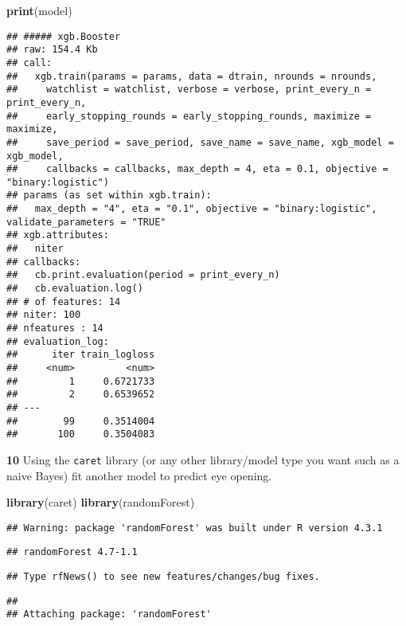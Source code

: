 \documentclass[
]{article}
\newenvironment{Shaded}{\begin{snugshade}}{\end{snugshade}}
\newcommand{\FunctionTok}[1]{\textcolor[rgb]{0.13,0.29,0.53}{\textbf{#1}}}
\newcommand{\NormalTok}[1]{#1}
\begin{document}
\begin{Shaded}
\begin{Highlighting}[]
\FunctionTok{print}\NormalTok{(model)}
\end{Highlighting}
\end{Shaded}

\begin{verbatim}
## ##### xgb.Booster
## raw: 154.4 Kb 
## call:
##   xgb.train(params = params, data = dtrain, nrounds = nrounds, 
##     watchlist = watchlist, verbose = verbose, print_every_n = print_every_n, 
##     early_stopping_rounds = early_stopping_rounds, maximize = maximize, 
##     save_period = save_period, save_name = save_name, xgb_model = xgb_model, 
##     callbacks = callbacks, max_depth = 4, eta = 0.1, objective = "binary:logistic")
## params (as set within xgb.train):
##   max_depth = "4", eta = "0.1", objective = "binary:logistic", validate_parameters = "TRUE"
## xgb.attributes:
##   niter
## callbacks:
##   cb.print.evaluation(period = print_every_n)
##   cb.evaluation.log()
## # of features: 14 
## niter: 100
## nfeatures : 14 
## evaluation_log:
##      iter train_logloss
##     <num>         <num>
##         1     0.6721733
##         2     0.6539652
## ---                    
##        99     0.3514004
##       100     0.3504083
\end{verbatim}

\textbf{10} Using the \texttt{caret} library (or any other library/model
type you want such as a naive Bayes) fit another model to predict eye
opening.

\begin{Shaded}
\begin{Highlighting}[]
\FunctionTok{library}\NormalTok{(caret)}
\FunctionTok{library}\NormalTok{(randomForest)}
\end{Highlighting}
\end{Shaded}

\begin{verbatim}
## Warning: package 'randomForest' was built under R version 4.3.1
\end{verbatim}

\begin{verbatim}
## randomForest 4.7-1.1
\end{verbatim}

\begin{verbatim}
## Type rfNews() to see new features/changes/bug fixes.
\end{verbatim}

\begin{verbatim}
## 
## Attaching package: 'randomForest'
\end{verbatim}
\end{document}
